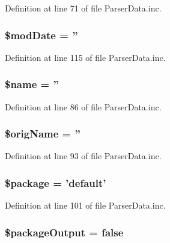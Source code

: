 \-Definition at line 71 of file \-Parser\-Data.\-inc.

\hypertarget{classparser_page_a609cb081c0f2153634104dd84f3693f9}{
\subsubsection[{\$mod\-Date}]{\setlength{\rightskip}{0pt plus 5cm}\$mod\-Date = ''}}\label{classparser_page_a609cb081c0f2153634104dd84f3693f9}


\-Definition at line 115 of file \-Parser\-Data.\-inc.

\hypertarget{classparser_page_ab2fc40d43824ea3e1ce5d86dee0d763b}{
\subsubsection[{\$name}]{\setlength{\rightskip}{0pt plus 5cm}\$name = ''}}\label{classparser_page_ab2fc40d43824ea3e1ce5d86dee0d763b}


\-Definition at line 86 of file \-Parser\-Data.\-inc.

\hypertarget{classparser_page_a76452cd63c66786618e7b83070d7a709}{
\subsubsection[{\$orig\-Name}]{\setlength{\rightskip}{0pt plus 5cm}\$orig\-Name = ''}}\label{classparser_page_a76452cd63c66786618e7b83070d7a709}


\-Definition at line 93 of file \-Parser\-Data.\-inc.

\hypertarget{classparser_page_a365395516cc195292e97e09bc0d165ae}{
\subsubsection[{\$package}]{\setlength{\rightskip}{0pt plus 5cm}\$package = 'default'}}\label{classparser_page_a365395516cc195292e97e09bc0d165ae}


\-Definition at line 101 of file \-Parser\-Data.\-inc.

\hypertarget{classparser_page_a62868ddf3244bfad64daf381e2c65f5a}{
\subsubsection[{\$package\-Output}]{\setlength{\rightskip}{0pt plus 5cm}\$package\-Output = false}}\label{classparser_page_a62868ddf3244bfad64daf381e2c65f5a}



